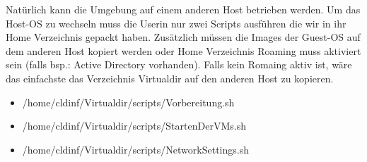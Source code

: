 \documentclass[a4,12pt]{scrartcl}
\begin{document}
\noindent Natürlich kann die Umgebung auf einem anderen Host betrieben werden. Um das Host-OS zu wechseln muss die Userin nur zwei Scripts ausführen die wir in ihr Home Verzeichnis gepackt haben. Zusätzlich müssen die Images der Guest-OS auf dem anderen Host kopiert werden oder Home Verzeichnis Roaming muss aktiviert sein (falls bsp.: Active Directory vorhanden). Falls kein Romaing aktiv ist, wäre das einfachste das Verzeichnis Virtualdir auf den anderen Host zu kopieren. 
\begin{itemize}
\item /home/cldinf/Virtualdir/scripts/Vorbereitung.sh
\item /home/cldinf/Virtualdir/scripts/StartenDerVMs.sh 
\item /home/cldinf/Virtualdir/scripts/NetworkSettings.sh
\end{itemize}
\end{document}
